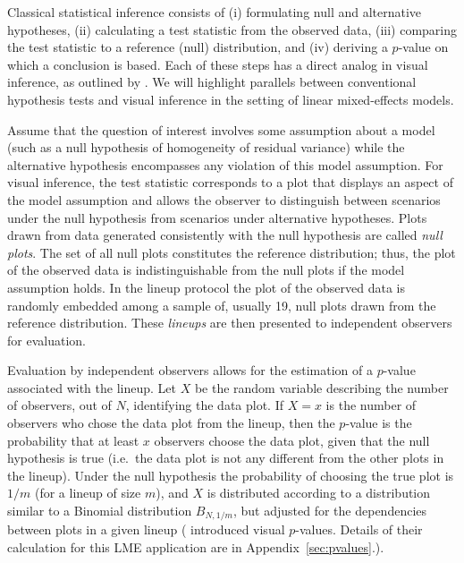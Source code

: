 \documentclass[12pt]{article} %
\newcommand{\alnote}[1]{\todo[inline,color=green!40]{#1}} %
\begin{document}
Classical statistical inference consists of 
(i) formulating  null and alternative hypotheses,
	(ii) calculating a test statistic from the observed data,
	(iii) comparing the test statistic to a reference (null) distribution,
	and (iv) deriving a $p$-value on which a conclusion is based.
Each of these steps has a direct analog in visual inference, as outlined by \cite{Buja:2009hp}. 
We will highlight  parallels between conventional hypothesis tests and visual inference in the setting of linear mixed-effects models.

Assume that  the question of interest involves  some assumption about a model (such as a null hypothesis of homogeneity of residual variance) while the alternative hypothesis  encompasses any violation of this model assumption. 
For visual inference, the test statistic corresponds to a plot  that displays an aspect of  the model assumption and allows the observer to distinguish between scenarios under the null hypothesis from scenarios under alternative hypotheses. 
Plots drawn from data generated consistently with the null hypothesis are called \emph{null plots}. The set of all null plots constitutes the reference distribution; thus, the plot of the observed data is indistinguishable from the null plots if the model assumption holds.
In the lineup protocol the plot of the observed data is randomly embedded
 among a sample of, usually 19, null plots drawn from the reference distribution.  These \emph{lineups} are then presented to independent observers for evaluation. 

Evaluation by independent observers  allows for the estimation of a $p$-value associated with the lineup.
 Let $X$ be the random variable describing  the number  of observers, out of $N$, identifying the data plot. 
If $X=x$ is  the number of observers who chose the data plot from the lineup, then the  $p$-value is  the probability that at least $x$ observers choose the data plot, given that the null hypothesis  is true (i.e.~the  data plot is not any different from the other plots in the lineup). Under the null hypothesis the probability of choosing the true plot is $1/m$ (for a lineup of size $m$), and $X$ is distributed according to a distribution similar to a Binomial distribution $B_{N, 1/m}$, but adjusted for the dependencies between plots in a given lineup
(\citet{mahbub:2013} introduced visual $p$-values. Details of their calculation for this LME application are in Appendix~\ref{sec:pvalues}.).
\end{document}
